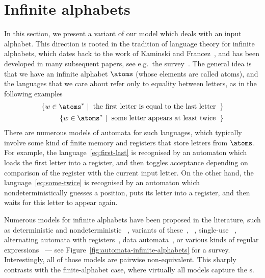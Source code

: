 \section{Infinite alphabets}
\label{sec:infinite-alphabets}


In this section, we present a variant of our model which deals with an input alphabet. This direction is rooted in the tradition of language theory for infinite alphabets, which dates back to the work of Kaminski and Francez~\cite{kaminskiFiniteMemoryAutomata1994}, and has been developed in many subsequent papers, see e.g.~the survey~\cite{bojanczykOrbitFiniteSetsTheir2017}. The general idea is that we have an infinite alphabet $\atoms$ (whose elements are called atoms), and the languages that we care about refer only to equality between letters, as in the following examples
\begin{align}
\setbuild{ w \in \atoms^*}{the first letter is equal to the last letter}
\label{eq:first-last}
\\
\setbuild{ w \in \atoms^*}{some letter appears at least twice}
\label{eq:some-twice}
\end{align}
There are numerous models of automata for such languages, which typically involve some kind of finite memory and registers that store letters from $\atoms$. For example, the language~\eqref{eq:first-last} is recognised by an automaton which loads the first letter into a register, and then toggles acceptance depending on comparison of the register with the current input letter. On the other hand, the language~\eqref{eq:some-twice} is recognised by an automaton which nondeterministically guesses a position, puts its letter into a register, and then waits for this letter to appear again. 

Numerous models for infinite alphabets have been proposed in the literature, such as deterministic and nondeterministic ~\cite[Section 2]{kaminskiFiniteMemoryAutomata1994},  variants of these~\cite[Definition 2.1]{nevenFiniteStateMachines2004}, ~\cite[Section 5]{colcombet2015unambiguity}, single-use ~\cite[Definition 3]{bojanczykstefanski2020}, alternating automata with registers~\cite[Section 2.5]{DBLP:journals/tocl/DemriL09}, data automata~\cite[Section 4.2]{bojanczykTwovariableLogicData2011}, or various kinds of regular expressions~\cite{regexpKaminskiTan2004,regexpLibkin2015,KleeneNominal2019} --- see Figure~\ref{fig:automata-infinite-alphabets} for a survey. Interestingly, all of those models are pairwise non-equivalent. This sharply contrasts with the finite-alphabet case, where virtually all models capture the s.

